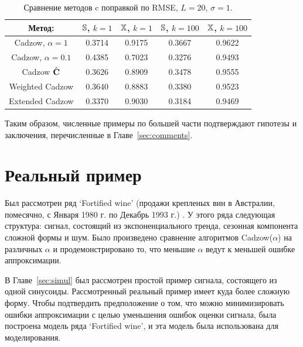\documentclass[12pt, specialist, subf,href,colorlinks=true,substylefile = spbu.rtx]{disser}
\theoremstyle{remark}
\theoremstyle{definition}
\begin{document}
\begin{table}[!hhh]
	\begin{center}
		\caption{Сравнение методов c поправкой по RMSE, $L = 20$, $\sigma=1$.}\label{fintable_improved}
		\begin{tabular}{|c|c|c|c|c|}
			\hline
			Метод: & $\mathbb{S}$, $k = 1$ & $\mathbb{X}$, $k = 1$ & $\mathbb{S}$, $k = 100$ & $\mathbb{X}$, $k = 100$  \\
			\hline
			Cadzow, $\alpha = 1$ & 0.3714 & 0.9175 & 0.3667 & 0.9622 \\
			\hline
			Cadzow, $\alpha = 0.1$ & 0.4385 & 0.7023 & 0.3276 & 0.9493 \\
			\hline
			Cadzow $\hat{\mathbf{C}}$ & 0.3626 & 0.8909 & 0.3478 & 0.9555 \\
			\hline
			Weighted Cadzow & 0.3640 & 0.8883 & 0.3380 & 0.9523 \\
			\hline
			Extended Cadzow & 0.3370 & 0.9030 & 0.3184 & 0.9469 \\
			\hline
		\end{tabular}
	\end{center}
\end{table}

Таким образом, численные примеры по большей части подтверждают гипотезы и заключения, перечисленные в Главе~\ref{sec:comments}.

\section{Реальный пример}
\label{sec:ex_real}
Был рассмотрен ряд `Fortified wine' (продажи крепленых вин в Австралии, помесячно, с Января 1980 г. по Декабрь 1993 г.) \citep{HyndmanTSDL}. У этого ряда следующая структура: сигнал, состоящий из экспоненциального тренда, сезонная компонента сложной формы и шум.
Было произведено сравнение алгоритмов Cadzow($\alpha$) на различных $\alpha$ и продемонстрировано то, что меньшие $\alpha$ ведут к меньшей ошибке аппроксимации.

В Главе~\ref{sec:simul} был рассмотрен простой пример сигнала, состоящего из одной синусоиды.
Рассмотренный реальный пример имеет куда более сложную форму. Чтобы подтвердить предположение о том, что можно минимизировать ошибки аппроксимации с целью уменьшения ошибок оценки сигнала,
была построена модель ряда `Fortified wine', и эта модель была использована для моделирования.
\end{document}
